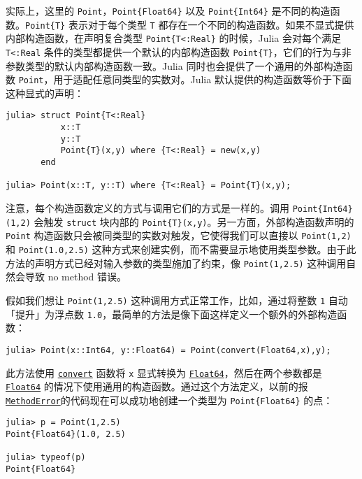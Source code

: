 实际上，这里的 \texttt{Point}，\texttt{Point\{Float64\}} 以及 \texttt{Point\{Int64\}} 是不同的构造函数。\texttt{Point\{T\}} 表示对于每个类型 \texttt{T} 都存在一个不同的构造函数。如果不显式提供内部构造函数，在声明复合类型 \texttt{Point\{T<:Real\}} 的时候，Julia 会对每个满足 \texttt{T<:Real} 条件的类型都提供一个默认的内部构造函数 \texttt{Point\{T\}}，它们的行为与非参数类型的默认内部构造函数一致。Julia 同时也会提供了一个通用的外部构造函数 \texttt{Point}，用于适配任意同类型的实数对。Julia 默认提供的构造函数等价于下面这种显式的声明：




\begin{verbatim}
julia> struct Point{T<:Real}
           x::T
           y::T
           Point{T}(x,y) where {T<:Real} = new(x,y)
       end

julia> Point(x::T, y::T) where {T<:Real} = Point{T}(x,y);
\end{verbatim}



注意，每个构造函数定义的方式与调用它们的方式是一样的。调用 \texttt{Point\{Int64\}(1,2)} 会触发 \texttt{struct} 块内部的 \texttt{Point\{T\}(x,y)}。另一方面，外部构造函数声明的 \texttt{Point} 构造函数只会被同类型的实数对触发，它使得我们可以直接以 \texttt{Point(1,2)} 和 \texttt{Point(1.0,2.5)} 这种方式来创建实例，而不需要显示地使用类型参数。由于此方法的声明方式已经对输入参数的类型施加了约束，像 \texttt{Point(1,2.5)} 这种调用自然会导致 {\textquotedbl}no method{\textquotedbl} 错误。



假如我们想让 \texttt{Point(1,2.5)} 这种调用方式正常工作，比如，通过将整数 \texttt{1} 自动「提升」为浮点数 \texttt{1.0}，最简单的方法是像下面这样定义一个额外的外部构造函数：




\begin{verbatim}
julia> Point(x::Int64, y::Float64) = Point(convert(Float64,x),y);
\end{verbatim}



此方法使用 \hyperlink{1846942650946171605}{\texttt{convert}} 函数将 \texttt{x} 显式转换为 \hyperlink{5027751419500983000}{\texttt{Float64}}，然后在两个参数都是 \hyperlink{5027751419500983000}{\texttt{Float64}} 的情况下使用通用的构造函数。通过这个方法定义，以前的报\hyperlink{68769522931907606}{\texttt{MethodError}}的代码现在可以成功地创建一个类型为 \texttt{Point\{Float64\}} 的点：




\begin{verbatim}
julia> p = Point(1,2.5)
Point{Float64}(1.0, 2.5)

julia> typeof(p)
Point{Float64}
\end{verbatim}



